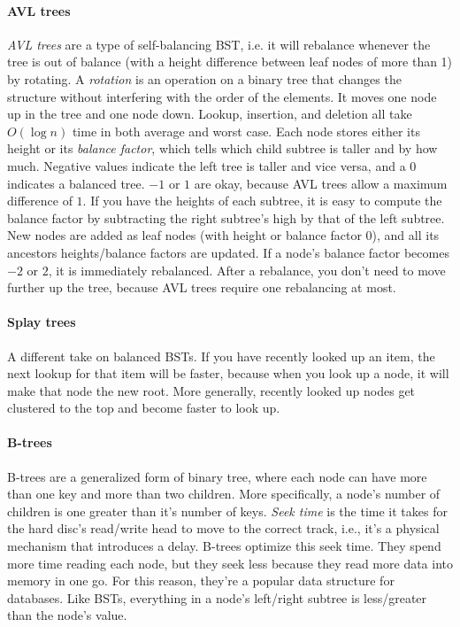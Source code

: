 \documentclass[8pt, table, xcdraw]{article}%
\begin{document}
\paragraph{AVL trees}

\emph{AVL trees} are a type of self-balancing BST, i.e. it will rebalance whenever the tree is out of balance (with a height difference  between leaf nodes of more than 1) by rotating. A \emph{rotation} is an operation on a binary tree that changes the structure without interfering with the order of the elements. It moves one node up in the tree and one node down. Lookup, insertion, and deletion all take $O(\log n)$ time in both average and worst case. Each node stores either its height or its \emph{balance factor}, which tells which child subtree is taller and by how much. Negative values indicate the left tree is taller and vice versa, and a $0$ indicates a balanced tree. $-1$ or $1$ are okay, because AVL trees allow a maximum difference of $1$. If you have the heights of each subtree, it is easy to compute the balance factor by subtracting the right subtree's high by that of the left subtree. New nodes are added as leaf nodes (with height or balance factor $0$), and all its ancestors heights/balance factors are updated. If a node's balance factor becomes $-2$ or $2$, it is immediately rebalanced. After a rebalance, you don't need to move further up the tree, because AVL trees require one rebalancing at most.

\paragraph{Splay trees}

A different take on balanced BSTs. If you have recently looked up an item, the next lookup for that item will be faster, because when you look up a node, it will make that node the new root. More generally, recently looked up nodes get clustered to the top and become faster to look up.

\paragraph{B-trees}

B-trees are a generalized form of binary tree, where each node can have more than one key and more than two children. More specifically, a node's number of children is one greater than it's number of keys. \emph{Seek time} is the time it takes for the hard disc's read/write head to move to the correct track, i.e., it's a physical mechanism that introduces a delay. B-trees optimize this seek time. They spend more time reading each node, but they seek less because they read more data into memory in one go. For this reason, they're a popular data structure for databases. Like BSTs, everything in a node's left/right subtree is less/greater than the node's value.
\end{document}
